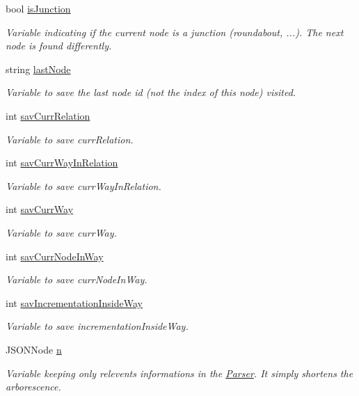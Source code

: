 \begin{DoxyCompactItemize}
bool \hyperlink{classCompleteDistBetweenNodes_a5bf75b766a0794c3bf1f1cc0082f5425}{is\+Junction}
\begin{DoxyCompactList}\small\item\em Variable indicating if the current node is a junction (roundabout, ...). The next node is found differently.\end{DoxyCompactList}\item 
string \hyperlink{classCompleteDistBetweenNodes_a2ea7364e344e4ebbdb054b03b8c0804c}{last\+Node}
\begin{DoxyCompactList}\small\item\em Variable to save the last node id (not the index of this node) visited.\end{DoxyCompactList}\item 
int \hyperlink{classCompleteDistBetweenNodes_a56d6ad02a96b4a4ed42b231ad320b8a7}{sav\+Curr\+Relation}
\begin{DoxyCompactList}\small\item\em Variable to save \textquotesingle{}curr\+Relation\textquotesingle{}.\end{DoxyCompactList}\item 
int \hyperlink{classCompleteDistBetweenNodes_aaaf272f7f6e6c44d8469ba4e0fe89c68}{sav\+Curr\+Way\+In\+Relation}
\begin{DoxyCompactList}\small\item\em Variable to save \textquotesingle{}curr\+Way\+In\+Relation\textquotesingle{}.\end{DoxyCompactList}\item 
int \hyperlink{classCompleteDistBetweenNodes_ac009920df856ab3b61623935760a0ea9}{sav\+Curr\+Way}
\begin{DoxyCompactList}\small\item\em Variable to save \textquotesingle{}curr\+Way\textquotesingle{}.\end{DoxyCompactList}\item 
int \hyperlink{classCompleteDistBetweenNodes_a196db97a89a7f2f84eecb05391d7bcdb}{sav\+Curr\+Node\+In\+Way}
\begin{DoxyCompactList}\small\item\em Variable to save \textquotesingle{}curr\+Node\+In\+Way\textquotesingle{}.\end{DoxyCompactList}\item 
int \hyperlink{classCompleteDistBetweenNodes_a9c387f0abd5351ec037fcceebde22514}{sav\+Incrementation\+Inside\+Way}
\begin{DoxyCompactList}\small\item\em Variable to save \textquotesingle{}incrementation\+Inside\+Way\textquotesingle{}.\end{DoxyCompactList}\item 
J\+S\+O\+N\+Node \hyperlink{classCompleteDistBetweenNodes_a8faad4406917e940d3175d9624883a31}{n}
\begin{DoxyCompactList}\small\item\em Variable keeping only relevents informations in the \hyperlink{classParser}{Parser}. It simply shortens the arborescence.\end{DoxyCompactList}\end{DoxyCompactItemize}

